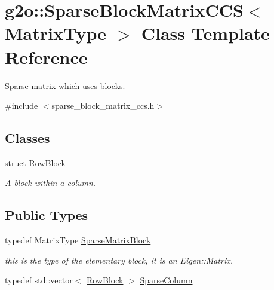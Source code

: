 \hypertarget{classg2o_1_1SparseBlockMatrixCCS}{}\section{g2o\+:\+:Sparse\+Block\+Matrix\+C\+CS$<$ Matrix\+Type $>$ Class Template Reference}
\label{classg2o_1_1SparseBlockMatrixCCS}


Sparse matrix which uses blocks.  




{\ttfamily \#include $<$sparse\+\_\+block\+\_\+matrix\+\_\+ccs.\+h$>$}

\subsection*{Classes}
\begin{DoxyCompactItemize}
\item 
struct \hyperlink{structg2o_1_1SparseBlockMatrixCCS_1_1RowBlock}{Row\+Block}
\begin{DoxyCompactList}\small\item\em A block within a column. \end{DoxyCompactList}\end{DoxyCompactItemize}
\subsection*{Public Types}
\begin{DoxyCompactItemize}
\item 
typedef Matrix\+Type \hyperlink{classg2o_1_1SparseBlockMatrixCCS_a41ea1c8c9d94a25544903ae8345c0354}{Sparse\+Matrix\+Block}
\begin{DoxyCompactList}\small\item\em this is the type of the elementary block, it is an Eigen\+::\+Matrix. \end{DoxyCompactList}\item 
typedef std\+::vector$<$ \hyperlink{structg2o_1_1SparseBlockMatrixCCS_1_1RowBlock}{Row\+Block} $>$ \hyperlink{classg2o_1_1SparseBlockMatrixCCS_a4fc5dfe0a9ff9bd62065ca4b17f25bc1}{Sparse\+Column}
\end{DoxyCompactItemize}
